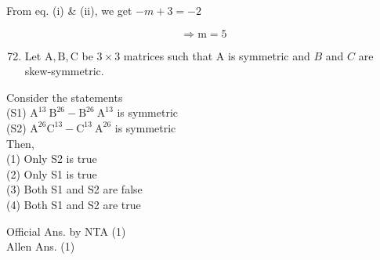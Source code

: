 \documentclass[10pt]{article}
\begin{document}
From eq. (i) \& (ii), we get \(-m+3=-2\)

\[
\Rightarrow \mathrm{m}=5
\]

\begin{enumerate}
  \setcounter{enumi}{71}
  \item Let \(\mathrm{A}, \mathrm{B}, \mathrm{C}\) be \(3 \times 3\) matrices such that A is symmetric and \(B\) and \(C\) are skew-symmetric.
\end{enumerate}

Consider the statements\\
(S1) \(\mathrm{A}^{13} \mathrm{~B}^{26}-\mathrm{B}^{26} \mathrm{~A}^{13}\) is symmetric\\
(S2) \(\mathrm{A}^{26} \mathrm{C}^{13}-\mathrm{C}^{13} \mathrm{~A}^{26}\) is symmetric\\
Then,\\
(1) Only S2 is true\\
(2) Only S1 is true\\
(3) Both S1 and S2 are false\\
(4) Both S1 and S2 are true

Official Ans. by NTA (1)\\
Allen Ans. (1)
\end{document}
